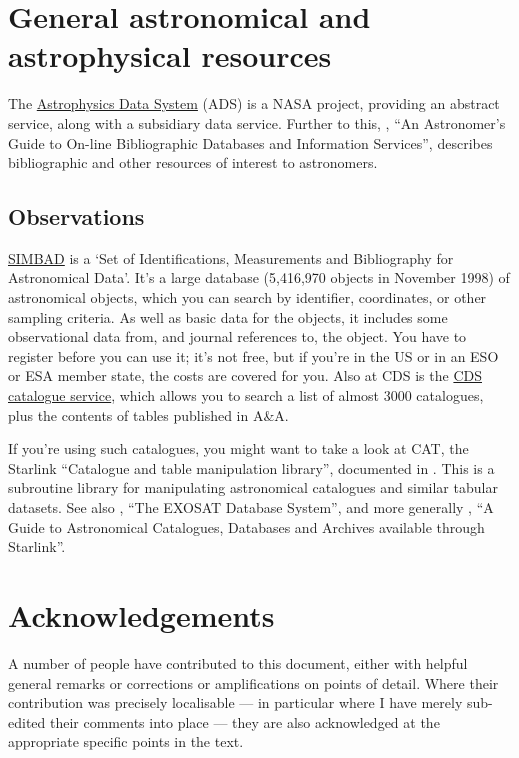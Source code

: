 \documentclass[11pt,oneside,chapters]{starlink}
\begin{document}
\chapter{General astronomical and astrophysical resources}
\label{s:astro:general}

The \href{http://cdsads.u-strasbg.fr/}{Astrophysics Data System} (ADS)
is a NASA project, providing an
abstract service, along with a subsidiary data service.
Further to this, ,
``An Astronomer's Guide to On-line Bibliographic Databases
and Information Services'', describes bibliographic and
other resources of interest to astronomers.

\section{Observations}
\label{s:obs}

\href{http://simbad.u-strasbg.fr/Simbad}{SIMBAD} is a
`Set of Identifications, Measurements and Bibliography for
Astronomical Data'.  It's a large database (5,416,970
objects in November 1998) of astronomical objects, which you
can search by identifier, coordinates, or other sampling
criteria.  As well as basic data for the objects, it
includes some observational data from, and journal
references to, the object.  You have to register before you
can use it; it's not free, but if you're in the US or in an
ESO or ESA member state, the costs are covered for you.
Also at CDS is the 
\href{http://cdsweb.u-strasbg.fr/Cats.html}{CDS catalogue service},
which allows you to search a list of
almost 3000 catalogues, plus the contents of tables
published in A\&A.

If you're using such catalogues, you might want to take a
look at CAT, the Starlink ``Catalogue and table
manipulation library'', documented in
.  This is a subroutine
library for manipulating astronomical catalogues and similar
tabular datasets.  See also
, ``The EXOSAT Database System'',
and more generally ,
``A Guide to Astronomical Catalogues, Databases and
Archives available through Starlink''.

\chapter{Acknowledgements}
\label{s:acknowledgements}

A number of people have contributed to this document, either
with helpful general remarks or corrections or amplifications on
points of detail.  Where their contribution was precisely localisable
--- in particular where I have merely sub-edited their comments into
place --- they are also acknowledged at the appropriate specific points
in the text.
\end{document}
